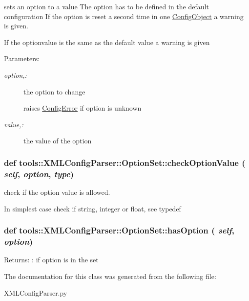 sets an option to a value The option has to be defined in the default configuration If the option is reset a second time in one \hyperlink{classtools_1_1XMLConfigParser_1_1ConfigObject}{ConfigObject} a warning is given. 

If the optionvalue is the same as the default value a warning is given \begin{Desc}
\item[Parameters:]
\begin{description}
\item[{\em option,:}]the option to change  \par
 raises \hyperlink{classtools_1_1XMLConfigParser_1_1ConfigError}{ConfigError} if option is unknown \item[{\em value,:}]the value of the option \end{description}
\end{Desc}
\hypertarget{classtools_1_1XMLConfigParser_1_1OptionSet_118681455ca2ff1e108084dd04452802}{
\subsubsection{\setlength{\rightskip}{0pt plus 5cm}def tools::XMLConfigParser::OptionSet::checkOptionValue ( {\em self}, \/   {\em option}, \/   {\em type})}}
\label{classtools_1_1XMLConfigParser_1_1OptionSet_118681455ca2ff1e108084dd04452802}


check if the option value is allowed. 

In simplest case check if string, integer or float, see typedef \hypertarget{classtools_1_1XMLConfigParser_1_1OptionSet_66effebc086caf0e5494f51502455f27}{
\subsubsection{\setlength{\rightskip}{0pt plus 5cm}def tools::XMLConfigParser::OptionSet::hasOption ( {\em self}, \/   {\em option})}}
\label{classtools_1_1XMLConfigParser_1_1OptionSet_66effebc086caf0e5494f51502455f27}


\begin{Desc}
\item[Returns:]: if option is in the set \end{Desc}


The documentation for this class was generated from the following file:\begin{CompactItemize}
\item 
XMLConfigParser.py\end{CompactItemize}
